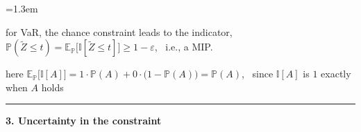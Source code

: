 \documentclass[10pt]{article}
\newcommand{\beat}[2]{%
  \par\bigskip\vspace{4pt}
  {\color{ruleink}\rule{\textwidth}{1pt}}\par\nobreak\vspace{4pt}
  {\large\bfseries #1.\; #2}\par\nobreak\vspace{6pt}}
\newenvironment{board}{%
  \par\vspace{4pt}
  \begingroup\leftskip=1.3em\relax\parskip=2pt\relax}{%
  \par\endgroup\vspace{4pt}}
\newcommand{\E}{\mathbb{E}}
\newcommand{\Prob}{\mathbb{P}}
\newcommand{\ind}[1]{\mathbb{I}[#1]}
\newcommand{\Zt}{\tilde Z}
\begin{document}
\begin{board}
\begin{minipage}{\dimexpr\linewidth-1.3em\relax}
\end{minipage}
\vspace{4pt}

\quad for VaR, the chance constraint leads to the indicator, \ $\Prob(\Zt \le t) = \E_{\Prob}\big[\ind{\Zt \le t}\big] \ge 1 - \varepsilon$, \ i.e., a MIP.
\vspace{3pt}

\quad here $\E_{\Prob}\big[\ind{A}\big] = 1 \cdot \Prob(A) + 0 \cdot \big(1 - \Prob(A)\big) = \Prob(A)$, \ since $\ind{A}$ is $1$ exactly when $A$ holds
\end{board}


\newpage

\beat{3}{Uncertainty in the constraint}
\end{document}
